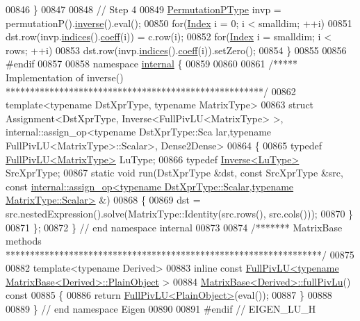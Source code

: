 \begin{DoxyCode}
00846   \}
00847 
00848   \textcolor{comment}{// Step 4}
00849   \hyperlink{group___core___module}{PermutationPType} invp = permutationP().\hyperlink{group___core___module_adb9af427f317202366c2832876064eb3}{inverse}().eval();
00850   \textcolor{keywordflow}{for}(\hyperlink{group___core___module_a554f30542cc2316add4b1ea0a492ff02}{Index} i = 0; i < smalldim; ++i)
00851     dst.row(invp.\hyperlink{group___core___module_a2f1ab379207fcd1ceb33941e25cf50c2}{indices}().\hyperlink{class_eigen_1_1_plain_object_base_afbfc12954f16d21aedb7bd839f64a278}{coeff}(i)) = c.row(i);
00852   \textcolor{keywordflow}{for}(\hyperlink{group___core___module_a554f30542cc2316add4b1ea0a492ff02}{Index} i = smalldim; i < rows; ++i)
00853     dst.row(invp.\hyperlink{group___core___module_a2f1ab379207fcd1ceb33941e25cf50c2}{indices}().\hyperlink{class_eigen_1_1_plain_object_base_afbfc12954f16d21aedb7bd839f64a278}{coeff}(i)).setZero();
00854 \}
00855 
00856 \textcolor{preprocessor}{#endif}
00857 
00858 \textcolor{keyword}{namespace }\hyperlink{namespaceinternal}{internal} \{
00859 
00860 
00861 \textcolor{comment}{/***** Implementation of inverse() *****************************************************/}
00862 \textcolor{keyword}{template}<\textcolor{keyword}{typename} DstXprType, \textcolor{keyword}{typename} MatrixType>
00863 \textcolor{keyword}{struct }Assignment<DstXprType, Inverse<FullPivLU<MatrixType> >, internal::assign\_op<typename DstXprType::Sca
      lar,typename FullPivLU<MatrixType>::Scalar>, Dense2Dense>
00864 \{
00865   \textcolor{keyword}{typedef} \hyperlink{group___l_u___module_class_eigen_1_1_full_piv_l_u}{FullPivLU<MatrixType>} LuType;
00866   \textcolor{keyword}{typedef} \hyperlink{class_eigen_1_1_inverse}{Inverse<LuType>} SrcXprType;
00867   \textcolor{keyword}{static} \textcolor{keywordtype}{void} run(DstXprType &dst, \textcolor{keyword}{const} SrcXprType &src, \textcolor{keyword}{const} 
      \hyperlink{struct_eigen_1_1internal_1_1assign__op}{internal::assign\_op<typename DstXprType::Scalar,typename MatrixType::Scalar>}
       &)
00868   \{
00869     dst = src.nestedExpression().solve(MatrixType::Identity(src.rows(), src.cols()));
00870   \}
00871 \};
00872 \} \textcolor{comment}{// end namespace internal}
00873 
00874 \textcolor{comment}{/******* MatrixBase methods *****************************************************************/}
00875 
00882 \textcolor{keyword}{template}<\textcolor{keyword}{typename} Derived>
00883 \textcolor{keyword}{inline} \textcolor{keyword}{const} \hyperlink{group___l_u___module_class_eigen_1_1_full_piv_l_u}{FullPivLU<typename MatrixBase<Derived>::PlainObject}
      >
00884 \hyperlink{group___core___module_a25da97d31acab0ee5d9d13bdbb0569da}{MatrixBase<Derived>::fullPivLu}()\textcolor{keyword}{ const}
00885 \textcolor{keyword}{}\{
00886   \textcolor{keywordflow}{return} \hyperlink{group___l_u___module_class_eigen_1_1_full_piv_l_u}{FullPivLU<PlainObject>}(eval());
00887 \}
00888 
00889 \} \textcolor{comment}{// end namespace Eigen}
00890 
00891 \textcolor{preprocessor}{#endif // EIGEN\_LU\_H}
\end{DoxyCode}
